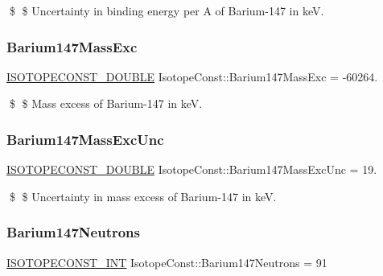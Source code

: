 \$ \$ Uncertainty in binding energy per A of Barium-\/147 in keV. \mbox{\label{group___isotope_const-_barium-_ba147_ga128af40d463ce1b998a4efb24461ae57}} 
\subsubsection{\texorpdfstring{Barium147\+Mass\+Exc}{Barium147MassExc}}
{\footnotesize\ttfamily \mbox{\hyperlink{group___isotope_const-_macros_ga8f45a7272ce02c0b4c65c44636ed719a}{I\+S\+O\+T\+O\+P\+E\+C\+O\+N\+S\+T\+\_\+\+D\+O\+U\+B\+LE}} Isotope\+Const\+::\+Barium147\+Mass\+Exc = -\/60264.}

\$ \$ Mass excess of Barium-\/147 in keV. \mbox{\label{group___isotope_const-_barium-_ba147_gafd21bf52a09062ba51c6d2709d26e808}} 
\subsubsection{\texorpdfstring{Barium147\+Mass\+Exc\+Unc}{Barium147MassExcUnc}}
{\footnotesize\ttfamily \mbox{\hyperlink{group___isotope_const-_macros_ga8f45a7272ce02c0b4c65c44636ed719a}{I\+S\+O\+T\+O\+P\+E\+C\+O\+N\+S\+T\+\_\+\+D\+O\+U\+B\+LE}} Isotope\+Const\+::\+Barium147\+Mass\+Exc\+Unc = 19.}

\$ \$ Uncertainty in mass excess of Barium-\/147 in keV. \mbox{\label{group___isotope_const-_barium-_ba147_gaeb2089f331a5a25b12478fda67446508}} 
\subsubsection{\texorpdfstring{Barium147\+Neutrons}{Barium147Neutrons}}
{\footnotesize\ttfamily \mbox{\hyperlink{group___isotope_const-_macros_ga5f18360b3e99483a35c32d789e62621c}{I\+S\+O\+T\+O\+P\+E\+C\+O\+N\+S\+T\+\_\+\+I\+NT}} Isotope\+Const\+::\+Barium147\+Neutrons = 91}

